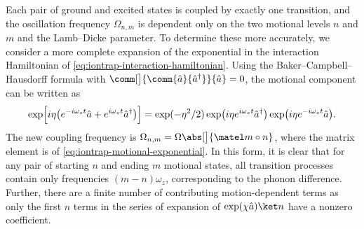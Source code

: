 Each pair of ground and excited states is coupled by exactly one transition, and the oscillation frequency $\Omega_{n,m}$ is dependent only on the two motional levels $n$ and $m$ and the Lamb--Dicke parameter.
To determine these more accurately, we consider a more complete expansion of the exponential in the interaction Hamiltonian of \cref{eq:iontrap-interaction-hamiltonian}.
Using the Baker--Campbell--Hausdorff formula with $\comm[\big]{\comm{\a}{\a^\dagger}}{\a} = 0$, the motional component can be written as
\begin{equation}\label{eq:iontrap-motional-exponential}
\exp\Bigl[i\eta\bigl(e^{-i\omega_zt}\hat{a} + e^{i\omega_zt}\hat{a}^\dagger\bigr)\Bigr]
    = \exp(-\eta^2/2)\exp\bigl(i\eta e^{i\omega_zt}\hat{a}^\dagger\bigr)\exp\bigl(i\eta e^{-i\omega_zt}\hat{a}\bigr).
\end{equation}
The new coupling frequency is $\Omega_{n,m} = \Omega\abs[\big]{\matel m\circ n}$, where the matrix element is of \cref{eq:iontrap-motional-exponential}.
In this form, it is clear that for any pair of starting $n$ and ending $m$ motional states, all transition processes contain only frequencies $(m - n)\omega_z$, corresponding to the phonon difference.
Further, there are a finite number of contributing motion-dependent terms as only the first $n$ terms in the series of expansion of $\exp(\chi\a)\ket n$ have a nonzero coefficient.

